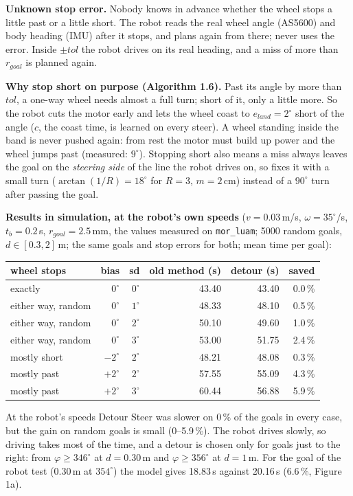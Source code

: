 \documentclass[11pt,a4paper]{article}
\begin{document}
{\noindent\textbf{Unknown stop error.} Nobody knows in advance whether the wheel stops a little past or a
little short. The robot reads the real wheel angle (AS5600) and body heading (IMU) after it stops, and
\FDetourSteer{} plans again from there; \FPlan{} never uses the error. Inside $\pm tol$ the robot drives on
its real heading, and a miss of more than $r_{goal}$ is planned again.

\smallskip
\noindent\textbf{Why stop short on purpose (Algorithm 1.6).} Past its angle by more than $tol$, a one-way wheel
needs almost a full turn; short of it, only a little more. So the robot cuts the motor early and lets the
wheel coast to $e_{land} = 2^\circ$ short of the angle ($c$, the coast time, is learned on every steer). A
wheel standing inside the band is never pushed again: from rest the motor must build up power and the
wheel jumps past (measured: $9^\circ$). Stopping short also means a miss always leaves the goal on the
\emph{steering side} of the line the robot drives on, so \FDriveReaim{} fixes it with a small turn
($\arctan(1/R) = 18^\circ$ for $R = 3$, $m = 2$\,cm) instead of a $90^\circ$ turn after passing the goal.

\smallskip
\noindent\textbf{Results in simulation, at the robot's own speeds} ($v = 0.03$\,m/s, $\omega = 35^\circ$/s,
$t_b = 0.2$\,s, $r_{goal} = 2.5$\,mm, the values measured on \texttt{mor\_luam}; 5000 random goals,
$d \in [0.3, 2]$\,m; the same goals and stop errors for both; mean time per goal):
\begin{center}
\begin{tabular}{lrrrrr}
\toprule
wheel stops & bias & sd & old method (s) & detour (s) & saved \\
\midrule
exactly             & $0^\circ$  & $0^\circ$ & 43.40 & 43.40 & 0.0\,\% \\
either way, random  & $0^\circ$  & $1^\circ$ & 48.33 & 48.10 & 0.5\,\% \\
either way, random  & $0^\circ$  & $2^\circ$ & 50.10 & 49.60 & 1.0\,\% \\
either way, random  & $0^\circ$  & $3^\circ$ & 53.00 & 51.75 & 2.4\,\% \\
mostly short        & $-2^\circ$ & $2^\circ$ & 48.21 & 48.08 & 0.3\,\% \\
mostly past         & $+2^\circ$ & $2^\circ$ & 57.55 & 55.09 & 4.3\,\% \\
mostly past         & $+2^\circ$ & $3^\circ$ & 60.44 & 56.88 & 5.9\,\% \\
\bottomrule
\end{tabular}
\end{center}
\noindent At the robot's speeds Detour Steer was slower on 0\,\% of the goals in every case, but the gain on
random goals is small (0--5.9\,\%). The robot drives slowly, so driving takes most of the time, and a detour is
chosen only for goals just to the right: from $\varphi \ge 346^\circ$ at $d = 0.30$\,m and $\varphi \ge 356^\circ$
at $d = 1$\,m. For the goal of the robot test (0.30\,m at $354^\circ$) the model gives 18.83\,s against
20.16\,s (6.6\,\%, Figure 1a).

}
\end{document}
